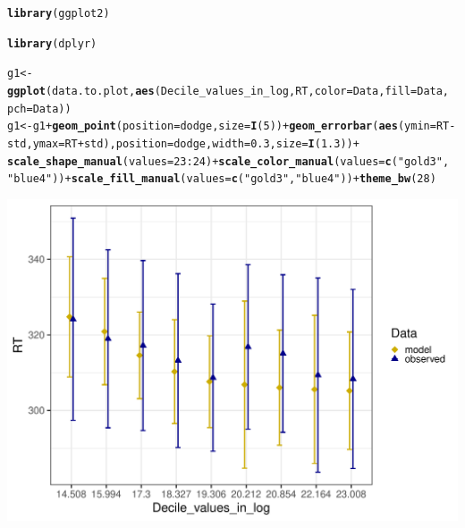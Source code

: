 \documentclass{article}\usepackage[]{graphicx}\usepackage[]{color}
\makeatletter
\def\maxwidth{ %
  \ifdim\Gin@nat@width>\linewidth
    \linewidth
  \else
    \Gin@nat@width
  \fi
}
\newcommand{\hlnum}[1]{\textcolor[rgb]{0.686,0.059,0.569}{#1}}%
\newcommand{\hlstr}[1]{\textcolor[rgb]{0.192,0.494,0.8}{#1}}%
\newcommand{\hlopt}[1]{\textcolor[rgb]{0,0,0}{#1}}%
\newcommand{\hlstd}[1]{\textcolor[rgb]{0.345,0.345,0.345}{#1}}%
\newcommand{\hlkwb}[1]{\textcolor[rgb]{0.69,0.353,0.396}{#1}}%
\newcommand{\hlkwc}[1]{\textcolor[rgb]{0.333,0.667,0.333}{#1}}%
\newcommand{\hlkwd}[1]{\textcolor[rgb]{0.737,0.353,0.396}{\textbf{#1}}}%
\newenvironment{kframe}{%
 \def\at@end@of@kframe{}%
 \ifinner\ifhmode%
  \def\at@end@of@kframe{\end{minipage}}%
  \begin{minipage}{\columnwidth}%
 \fi\fi%
 \def\FrameCommand##1{\hskip\@totalleftmargin \hskip-\fboxsep
 \colorbox{shadecolor}{##1}\hskip-\fboxsep
     \hskip-\linewidth \hskip-\@totalleftmargin \hskip\columnwidth}%
 \MakeFramed {\advance\hsize-\width
   \@totalleftmargin\z@ \linewidth\hsize
   \@setminipage}}%
 {\par\unskip\endMakeFramed%
 \at@end@of@kframe}
\newenvironment{knitrout}{}{} %
\makeatother
\begin{document}
\begin{knitrout}
\begin{kframe}
\begin{alltt}
\hlkwd{library}\hlstd{(ggplot2)}

\hlkwd{library}\hlstd{(dplyr)}

\hlstd{g1} \hlkwb{<-} \hlkwd{ggplot}\hlstd{(data.to.plot,} \hlkwd{aes}\hlstd{(Decile_values_in_log, RT,} \hlkwc{color} \hlstd{= Data,} \hlkwc{fill} \hlstd{= Data,}
    \hlkwc{pch} \hlstd{= Data))}
\hlstd{g1} \hlkwb{<-} \hlstd{g1} \hlopt{+} \hlkwd{geom_point}\hlstd{(}\hlkwc{position} \hlstd{= dodge,} \hlkwc{size} \hlstd{=} \hlkwd{I}\hlstd{(}\hlnum{5}\hlstd{))} \hlopt{+} \hlkwd{geom_errorbar}\hlstd{(}\hlkwd{aes}\hlstd{(}\hlkwc{ymin} \hlstd{= RT} \hlopt{-}
    \hlstd{std,} \hlkwc{ymax} \hlstd{= RT} \hlopt{+} \hlstd{std),} \hlkwc{position} \hlstd{= dodge,} \hlkwc{width} \hlstd{=} \hlnum{0.3}\hlstd{,} \hlkwc{size} \hlstd{=} \hlkwd{I}\hlstd{(}\hlnum{1.3}\hlstd{))} \hlopt{+}
    \hlkwd{scale_shape_manual}\hlstd{(}\hlkwc{values} \hlstd{=} \hlnum{23}\hlopt{:}\hlnum{24}\hlstd{)} \hlopt{+} \hlkwd{scale_color_manual}\hlstd{(}\hlkwc{values} \hlstd{=} \hlkwd{c}\hlstd{(}\hlstr{"gold3"}\hlstd{,}
    \hlstr{"blue4"}\hlstd{))} \hlopt{+} \hlkwd{scale_fill_manual}\hlstd{(}\hlkwc{values} \hlstd{=} \hlkwd{c}\hlstd{(}\hlstr{"gold3"}\hlstd{,} \hlstr{"blue4"}\hlstd{))} \hlopt{+} \hlkwd{theme_bw}\hlstd{(}\hlnum{28}\hlstd{)}
\end{alltt}
\end{kframe}
\end{knitrout}
\begin{knitrout}
\color{fgcolor}
\includegraphics[width=\maxwidth]{figures/figure_ns_unnamed-chunk-14-1} 

\end{knitrout}
\end{document}
